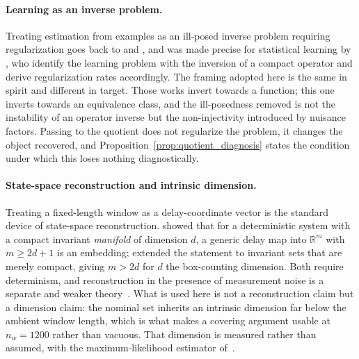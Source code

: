\documentclass[a4paper]{cas-sc}
\newcommand{\R}{\ensuremath{\mathbb{R}}}
\begin{document}
\paragraph{Learning as an inverse problem.}
Treating estimation from examples as an ill-posed inverse problem requiring
regularization goes back to \citet{hadamard1932} and
\citet{tikhonov1977}, and was made precise for statistical learning by
\citet{devito2005}, who identify the learning problem with the inversion of a
compact operator and derive regularization rates accordingly. The framing
adopted here is the same in spirit and different in target. Those works invert
towards a function; this one inverts towards an equivalence class, and the
ill-posedness removed is not the instability of an operator inverse but the
non-injectivity introduced by nuisance factors. Passing to the quotient does
not regularize the problem, it changes the object recovered, and
Proposition~\ref{prop:quotient_diagnosis} states the condition under which
this loses nothing diagnostically.

\paragraph{State-space reconstruction and intrinsic dimension.}
Treating a fixed-length window as a delay-coordinate vector is the standard
device of state-space reconstruction. \citet{takens1981} showed that for a
deterministic system with a compact invariant \emph{manifold} of dimension
\(d\), a generic delay map into \(\R^{m}\) with \(m\ge 2d+1\) is an embedding;
\citet{sauer1991} extended the statement to invariant sets that are merely
compact, giving \(m>2d\) for \(d\) the box-counting dimension. Both require
determinism, and reconstruction in the presence of measurement noise is a
separate and weaker theory~\citep{casdagli1991}. What is used here is not a
reconstruction claim but a dimension claim: the nominal set inherits an
intrinsic dimension far below the ambient window length, which is what makes a
covering argument usable at \(n_w=1200\) rather than vacuous. That dimension
is measured rather than assumed, with the maximum-likelihood estimator
of~\citet{levina2004}.
\end{document}
